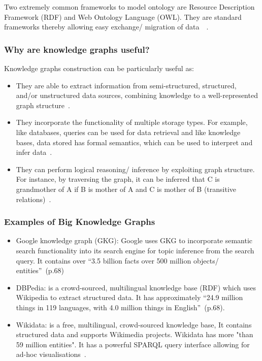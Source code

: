 Two extremely common frameworks to model ontology are Resource Description Framework (RDF) and Web Ontology Language (OWL). They are standard frameworks thereby allowing easy exchange/ migration of data~\cite{4_towards_kg}~\cite{retrospective_kg}.


\subsubsection{Why are knowledge graphs useful?}

Knowledge graphs construction can be particularly useful as: 

\begin{itemize}
\item They are able to extract information from semi-structured, structured, and/or unstructured data sources, combining knowledge to a well-represented graph structure~\cite{retrospective_kg}. 

\item They incorporate the functionality of multiple storage types. For example, like databases, queries can be used for data retrieval and like knowledge bases, data stored has formal semantics, which can be used to interpret and infer data~\cite{2_guide_kg}. 

\item They can perform logical reasoning/ inference by exploiting graph structure. For instance, by traversing the graph, it can be inferred that C is grandmother of A if B is mother of A and C is mother of B (transitive relations)~\cite{2_guide_kg}. 
\end{itemize}  


\subsubsection{Examples of Big Knowledge Graphs}

\begin{itemize}
\item Google knowledge graph (GKG):  Google uses GKG to incorporate semantic search functionality into its search engine for topic inference from the search query. It contains over ``3.5
billion facts over 500 million objects/ entities''~\cite{retrospective_kg}(p.68)

\item DBPedia: is a crowd-sourced, multilingual knowledge base (RDF) which uses Wikipedia to extract structured data. It has approximately ``24.9 million things in 119 languages, with 4.0 million things in English''~\cite{retrospective_kg}(p.68).

\item Wikidata: is a free, multilingual, crowd-sourced
knowledge base, It contains structured data and supports Wikimedia projects. Wikidata has more "than 59 million entities". It has a powerful SPARQL query interface allowing for ad-hoc visualisations~\cite{ieee_named_entity}. 

\end{itemize}

